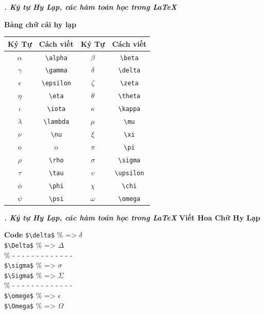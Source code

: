 \documentclass[11pt]{beamer}
\newcounter{group}
\begin{document}
	\begin{frame}[fragile]{\textbf{\textit{\thegroup. Ký tự Hy Lạp, các hàm toán học trong \LaTeX}}}
		\begin{block}{\textbf{Bảng chữ cái hy lạp}}
			\begin{table}[h]
				\begin{tabular}{|c|c|c|c|}
					\hline
					\rowcolor{red!80}
					\color{white}\textbf{Ký Tự} & \color{white}\textbf{Cách viết} & \color{white}\textbf{Ký Tự} & \color{white}\textbf{Cách viết}\\
					\hline
					$\alpha$ & \verb*|\alpha| & $\beta$ & \verb*|\beta|\\
					$\gamma$ & \verb*|\gamma| & $\delta$ & \verb*|\delta|\\
					$\epsilon$ & \verb*|\epsilon| & $\zeta$ & \verb*|\zeta|\\
					$\eta$ & \verb*|\eta| & $\theta$ & \verb*|\theta|\\
					$\iota$ & \verb*|\iota| & $\kappa$ & \verb*|\kappa|\\
					$\lambda$ & \verb*|\lambda| & $\mu$ & \verb*|\mu|\\
					$\nu$ & \verb*|\nu| & $\xi$ & \verb*|\xi|\\
					o & o & $\pi$ & \verb*|\pi|\\
					$\rho$ & \verb*|\rho| & $\sigma$ & \verb*|\sigma|\\
					$\tau$ & \verb*|\tau| & $\upsilon$ & \verb*|\upsilon|\\
					$\phi$ & \verb*|\phi| & $\chi$ & \verb*|\chi|\\
					$\psi$ & \verb*|\psi| & $\omega$ & \verb*|\omega|\\
					\hline
				\end{tabular}
			\end{table}
		\end{block}
	\end{frame}
	\begin{frame}[fragile]{\textbf{\textit{\thegroup. Ký tự Hy Lạp, các hàm toán học trong \LaTeX}}}
		\textbf{Viết Hoa Chữ Hy Lạp}
		\begin{block}{\textbf{Code}}
			\verb*|$\delta$| {\color{green} \% => $\delta$}\\
			\verb*|$\Delta$| {\color{green} \% => $\Delta$}\\
			{\color{green} \% - - - - - - - - - - - - -}\\
			\verb*|$\sigma$| {\color{green} \% => $\sigma$}\\
			\verb*|$\Sigma$| {\color{green} \% => $\Sigma$}\\
			{\color{green} \% - - - - - - - - - - - - -}\\
			\verb*|$\omege$| {\color{green} \% => $\epsilon$}\\
			\verb*|$\Omega$| {\color{green} \% => $\Omega$}
		\end{block}
	\end{frame}
\end{document}
